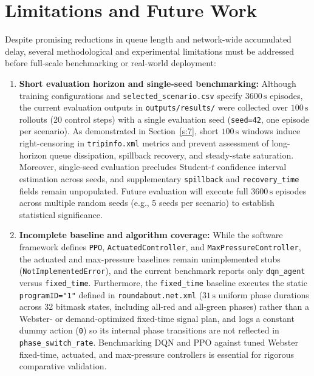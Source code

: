 \section{Limitations and Future Work}\label{s:8}

Despite promising reductions in queue length and network-wide accumulated delay, several methodological and experimental limitations must be addressed before full-scale benchmarking or real-world deployment:

\begin{enumerate}
\item \textbf{Short evaluation horizon and single-seed benchmarking:} Although training configurations and \texttt{selected\_scenario.csv} specify $3600\,\mathrm{s}$ episodes, the current evaluation outputs in \texttt{outputs/results/} were collected over $100\,\mathrm{s}$ rollouts (20 control steps) with a single evaluation seed (\texttt{seed=42}, one episode per scenario). As demonstrated in Section~\ref{s:7}, short $100\,\mathrm{s}$ windows induce right-censoring in \texttt{tripinfo.xml} metrics and prevent assessment of long-horizon queue dissipation, spillback recovery, and steady-state saturation. Moreover, single-seed evaluation precludes Student-$t$ confidence interval estimation across seeds, and supplementary \texttt{spillback} and \texttt{recovery\_time} fields remain unpopulated. Future evaluation will execute full $3600\,\mathrm{s}$ episodes across multiple random seeds (e.g., 5 seeds per scenario) to establish statistical significance.

\item \textbf{Incomplete baseline and algorithm coverage:} While the software framework defines \texttt{PPO}, \texttt{ActuatedController}, and \texttt{MaxPressureController}, the actuated and max-pressure baselines remain unimplemented stubs (\texttt{NotImplementedError}), and the current benchmark reports only \texttt{dqn\_agent} versus \texttt{fixed\_time}. Furthermore, the \texttt{fixed\_time} baseline executes the static \texttt{programID="1"} defined in \texttt{roundabout.net.xml} ($31\,\mathrm{s}$ uniform phase durations across 32 bitmask states, including all-red and all-green phases) rather than a Webster- or demand-optimized fixed-time signal plan, and logs a constant dummy action (\texttt{0}) so its internal phase transitions are not reflected in \texttt{phase\_switch\_rate}. Benchmarking DQN and PPO against tuned Webster fixed-time, actuated, and max-pressure controllers is essential for rigorous comparative validation.


\end{enumerate}

